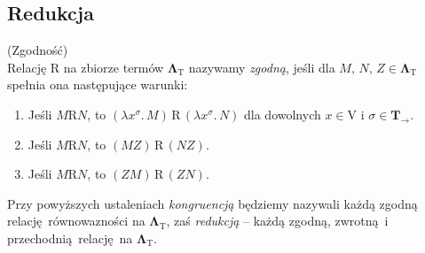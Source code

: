 \subsection{Redukcja}
\begin{definicja}(Zgodność)\\
  Relację \(\mathrm{R}\) na zbiorze termów \(\mathbf{\Lambda}_{\mathrm{T}}\) nazywamy \emph{zgodną}, jeśli dla \(M,\,N,\,Z\in\mathbf{\Lambda}_{\mathrm{T}}\) spełnia ona następujące warunki:
  \begin{enumerate}[label=\roman*)]
    \item Jeśli \(M\mathrm{R} N\), to \((\lambda x^\sigma.\,M)\, \mathrm{R}\, (\lambda x^\sigma.\, N)\) dla dowolnych \(x\in \mathrm{V}\) i \(\sigma\in \mathbf{T_\to}\).
    \item Jeśli \(M\mathrm{R} N\), to \((MZ)\,\mathrm{R}\, (NZ)\).
    \item Jeśli \(M\mathrm{R} N\), to \((ZM)\,\mathrm{R}\, (ZN)\).
  \end{enumerate}
Przy powyższych ustaleniach \emph{kongruencją} będziemy nazywali każdą zgodną relację równowazności na \(\mathbf{\Lambda}_{\mathrm{T}}\), zaś \emph{redukcją} – każdą zgodną, zwrotną i przechodnią relację na \(\mathbf{\Lambda}_{\mathrm{T}}\).
\end{definicja}

